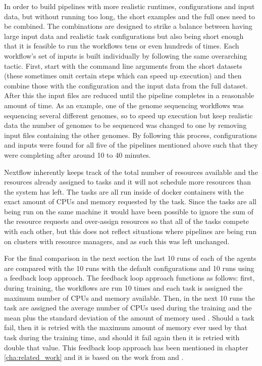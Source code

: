 In order to build pipelines with more realistic runtimes, configurations and input data, but without running too long, the short examples and the full ones need to be combined. The combinations are designed to strike a balance between having large input data and realistic task configurations but also being short enough that it is feasible to run the workflows tens or even hundreds of times. Each workflow’s set of inputs is built individually by following the same overarching tactic. First, start with the command line arguments from the short datasets (these sometimes omit certain steps which can speed up execution) and then combine those with the configuration and the input data from the full dataset. After this the input files are reduced until the pipeline completes in a reasonable amount of time. As an example, one of the genome sequencing workflows was sequencing several different genomes, so to speed up execution but keep realistic data the number of genomes to be sequenced was changed to one by removing input files containing the other genomes. By following this process, configurations and inputs were found for all five of the pipelines mentioned above such that they were completing after around 10 to 40 minutes.  

Nextflow inherently keeps track of the total number of resources available and the resources already assigned to tasks and it will not schedule more resources than the system has left. The tasks are all run inside of docker containers with the exact amount of CPUs and memory requested by the task. Since the tasks are all being run on the same machine it would have been possible to ignore the sum of the resource requests and over-assign resources so that all of the tasks compete with each other, but this does not reflect situations where pipelines are being run on clusters with resource managers, and as such this was left unchanged.

For the final comparison in the next section the last 10 runs of each of the agents are compared with the 10 runs with the default configurations and 10 runs using a feedback loop approach. The feedback loop approach functions as follows: first, during training, the workflows are run 10 times and each task is assigned the maximum number of CPUs and memory available. Then, in the next 10 runs the task are assigned the average number of CPUs used during the training and the mean plus the standard deviation of the amount of memory used . Should a task fail, then it is retried with the maximum amount of memory ever used by that task during the training time, and should it fail again then it is retried with double that value. This feedback loop approach has been mentioned in chapter \ref{cha:related_work} and it is based on the work from \cite{tovarjob} and \cite{FeedbackBasedAllocation}.



